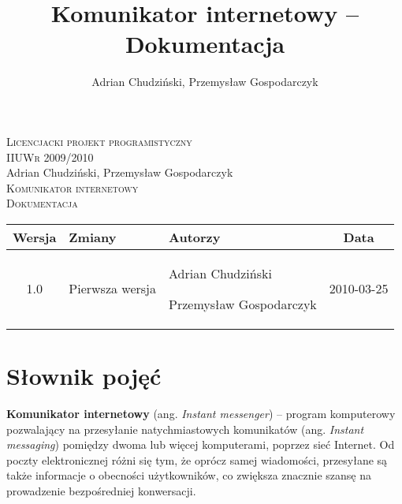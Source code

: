 \documentclass[a4paper,12pt]{article}
\author{Adrian Chudziński, Przemysław Gospodarczyk}
\title{Komunikator internetowy -- Dokumentacja}
\begin{document}
\makeatletter
    \renewcommand\@seccntformat[1]{\csname the#1\endcsname.\quad}
    \renewcommand\numberline[1]{#1.\hskip0.7em}
\makeatother

\begin{titlepage}
\begin{center}

    \textsc{Licencjacki projekt programistyczny}\\[0.1cm]
    \textsc{IIUWr 2009/2010}\\[6cm]
    Adrian Chudziński, Przemysław Gospodarczyk\\[1cm]
    \textsc{\Large Komunikator internetowy}\\[0.25cm]
    \textsc{\large Dokumentacja}\\[8.675cm]

    {\footnotesize
    \begin{tabular}{| c | p{4cm} | p{4.25cm} | c | }
        \hline
        Wersja  &
        Zmiany  &
        Autorzy &
        Data    \\
        \hline
        1.0                                                                   &
        Pierwsza wersja                                                       &
        \par Adrian Chudziński \par Przemysław Gospodarczyk                                                  &
        2010-03-25                                                            \\
        \hline
    \end{tabular}
    }

\end{center}
\end{titlepage}

\break

\setcounter{page}{2}

\tableofcontents

\break
\section[Słownik pojęć]{Słownik pojęć}
\textbf{Komunikator internetowy} (ang. \textit{Instant messenger}) -- program komputerowy pozwalający na przesyłanie natychmiastowych komunikatów (ang. \textit{Instant messaging}) pomiędzy dwoma lub więcej komputerami, poprzez sieć Internet. Od poczty elektronicznej różni się tym, że oprócz samej wiadomości, przesyłane są także informacje o obecności użytkowników, co zwiększa znacznie szansę na prowadzenie bezpośredniej konwersacji.\\
\end{document}
